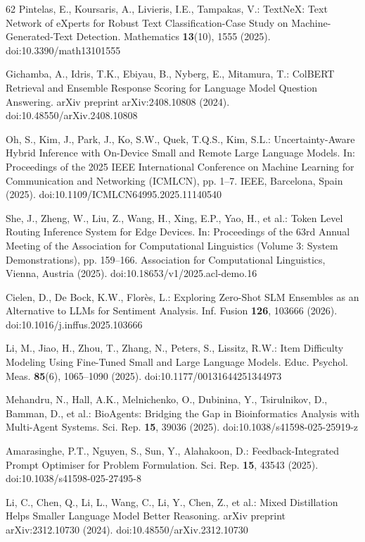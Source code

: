 \begin{thebibliography}{62}
Pintelas, E., Koursaris, A., Livieris, I.E., Tampakas, V.: TextNeX: Text Network of eXperts for Robust Text Classification-Case Study on Machine-Generated-Text Detection. Mathematics \textbf{13}(10), 1555 (2025). doi:10.3390/math13101555

Gichamba, A., Idris, T.K., Ebiyau, B., Nyberg, E., Mitamura, T.: ColBERT Retrieval and Ensemble Response Scoring for Language Model Question Answering. arXiv preprint arXiv:2408.10808 (2024). doi:10.48550/arXiv.2408.10808

Oh, S., Kim, J., Park, J., Ko, S.W., Quek, T.Q.S., Kim, S.L.: Uncertainty-Aware Hybrid Inference with On-Device Small and Remote Large Language Models. In: Proceedings of the 2025 IEEE International Conference on Machine Learning for Communication and Networking (ICMLCN), pp. 1--7. IEEE, Barcelona, Spain (2025). doi:10.1109/ICMLCN64995.2025.11140540

She, J., Zheng, W., Liu, Z., Wang, H., Xing, E.P., Yao, H., et al.: Token Level Routing Inference System for Edge Devices. In: Proceedings of the 63rd Annual Meeting of the Association for Computational Linguistics (Volume 3: System Demonstrations), pp. 159--166. Association for Computational Linguistics, Vienna, Austria (2025). doi:10.18653/v1/2025.acl-demo.16

Cielen, D., De Bock, K.W., Florès, L.: Exploring Zero-Shot SLM Ensembles as an Alternative to LLMs for Sentiment Analysis. Inf. Fusion \textbf{126}, 103666 (2026). doi:10.1016/j.inffus.2025.103666

Li, M., Jiao, H., Zhou, T., Zhang, N., Peters, S., Lissitz, R.W.: Item Difficulty Modeling Using Fine-Tuned Small and Large Language Models. Educ. Psychol. Meas. \textbf{85}(6), 1065--1090 (2025). doi:10.1177/00131644251344973

Mehandru, N., Hall, A.K., Melnichenko, O., Dubinina, Y., Tsirulnikov, D., Bamman, D., et al.: BioAgents: Bridging the Gap in Bioinformatics Analysis with Multi-Agent Systems. Sci. Rep. \textbf{15}, 39036 (2025). doi:10.1038/s41598-025-25919-z

Amarasinghe, P.T., Nguyen, S., Sun, Y., Alahakoon, D.: Feedback-Integrated Prompt Optimiser for Problem Formulation. Sci. Rep. \textbf{15}, 43543 (2025). doi:10.1038/s41598-025-27495-8

Li, C., Chen, Q., Li, L., Wang, C., Li, Y., Chen, Z., et al.: Mixed Distillation Helps Smaller Language Model Better Reasoning. arXiv preprint arXiv:2312.10730 (2024). doi:10.48550/arXiv.2312.10730

\end{thebibliography}
